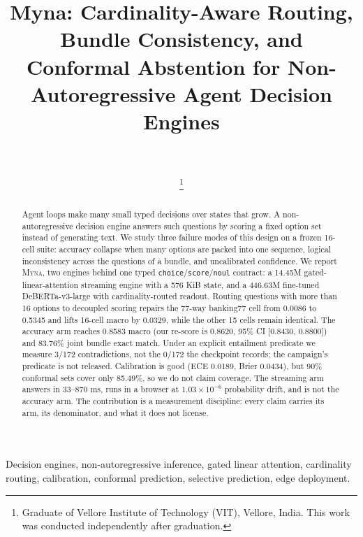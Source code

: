 \documentclass[journal]{IEEEtran}
\newcommand{\myna}{\textsc{Myna}}
\begin{document}
\title{Myna: Cardinality-Aware Routing, Bundle Consistency, and\\Conformal Abstention for Non-Autoregressive Agent Decision Engines}
\author{\\
\\
\thanks{Graduate of Vellore Institute of Technology (VIT), Vellore, India. This work was conducted independently after graduation.}}
\IEEEoverridecommandlockouts
\maketitle
\begin{abstract}
Agent loops make many small typed decisions over states that grow. A non-autoregressive decision engine answers such questions by scoring a fixed option set instead of generating text. We study three failure modes of this design on a frozen 16-cell suite: accuracy collapse when many options are packed into one sequence, logical inconsistency across the questions of a bundle, and uncalibrated confidence. We report \myna, two engines behind one typed \texttt{choice}/\texttt{score}/\texttt{noul} contract: a 14.45M gated-linear-attention streaming engine with a 576 KiB state, and a 446.63M fine-tuned DeBERTa-v3-large with cardinality-routed readout. Routing questions with more than 16 options to decoupled scoring repairs the 77-way banking77 cell from 0.0086 to 0.5345 and lifts 16-cell macro by 0.0329, while the other 15 cells remain identical. The accuracy arm reaches 0.8583 macro (our re-score is 0.8620, 95\% CI [0.8430, 0.8800]) and 83.76\% joint bundle exact match. Under an explicit entailment predicate we measure 3/172 contradictions, not the 0/172 the checkpoint records; the campaign's predicate is not released. Calibration is good (ECE 0.0189, Brier 0.0434), but 90\% conformal sets cover only 85.49\%, so we do not claim coverage. The streaming arm answers in 33--870 ms, runs in a browser at $1.03\times10^{-6}$ probability drift, and is not the accuracy arm. The contribution is a measurement discipline: every claim carries its arm, its denominator, and what it does not license.
\end{abstract}
\begin{IEEEkeywords}
Decision engines, non-autoregressive inference, gated linear attention, cardinality routing, calibration, conformal prediction, selective prediction, edge deployment.
\end{IEEEkeywords}



\clearpage

\end{document}
